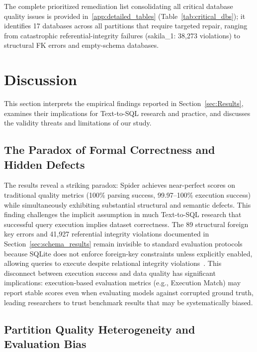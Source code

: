 \documentclass[print]{einformatica}
\begin{document}
The complete prioritized remediation list consolidating all critical database quality issues is provided in~\ref{app:detailed_tables} (Table~\ref{tab:critical_dbs}); it identifies 17 databases across all partitions that require targeted repair, ranging from catastrophic referential-integrity failures (sakila\_1: 38,273 violations) to structural FK errors and empty-schema databases.

\FloatBarrier
\section{Discussion}\label{sec:Discussion}

This section interprets the empirical findings reported in Section~\ref{sec:Results}, examines their implications for Text-to-SQL research and practice, and discusses the validity threats and limitations of our study.

\subsection{The Paradox of Formal Correctness and Hidden Defects}

The results reveal a striking paradox: Spider achieves near-perfect scores on traditional quality metrics (100\% parsing success, 99.97--100\% execution success) while simultaneously exhibiting substantial structural and semantic defects. This finding challenges the implicit assumption in much Text-to-SQL research that successful query execution implies dataset correctness. The 89 structural foreign key errors and 41,927 referential integrity violations documented in Section~\ref{sec:schema_results} remain invisible to standard evaluation protocols because SQLite does not enforce foreign-key constraints unless explicitly enabled, allowing queries to execute despite relational integrity violations~\cite{sqliteForeignKeys}. This disconnect between execution success and data quality has significant implications: execution-based evaluation metrics (e.g., Execution Match) may report stable scores even when evaluating models against corrupted ground truth, leading researchers to trust benchmark results that may be systematically biased.

\subsection{Partition Quality Heterogeneity and Evaluation Bias}
\end{document}
